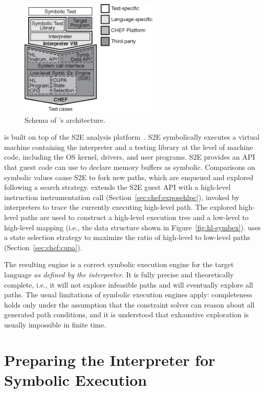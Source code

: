 \begin{figure}
  \centering
  \includegraphics[width=2.6in]{figures/chef/system-arch}
  \caption{Schema of \chef's architecture.}
  \label{fig:system-arch}
\end{figure}

\chef is built on top of the S2E analysis platform~\cite{s2eSystem}. S2E symbolically executes a virtual machine containing the interpreter and a testing library at the level of machine code,  including the OS kernel, drivers, and user programs.  S2E provides an API that guest code can use to declare memory buffers as symbolic. Comparisons on symbolic values cause S2E to fork new paths, which are enqueued and explored following a search strategy.
%
\chef extends the S2E guest API with a high-level instruction instrumentation call (Section~\ref{sec:chef:exposehlpc}), invoked by interpreters to trace the currently executing high-level path.  The explored high-level paths are used to construct a high-level execution tree and a low-level to high-level mapping (i.e., the data structure shown in Figure~\ref{fig:hl-symbex}).  \chef uses a state selection strategy to maximize the ratio of high-level to low-level paths (Section~\ref{sec:chef:cupa}).

The resulting engine is a correct symbolic execution engine for the target language \textit{as defined by the interpreter}. It is fully precise and theoretically complete, i.e., it will not explore infeasible paths and will eventually explore all paths. The usual limitations of symbolic execution engines apply: completeness holds only under the assumption that the constraint solver can reason about all generated path conditions, and it is understood that exhaustive exploration is usually impossible in finite time.


\section{Preparing the Interpreter for Symbolic Execution}
\label{sec:chef:recipe}

